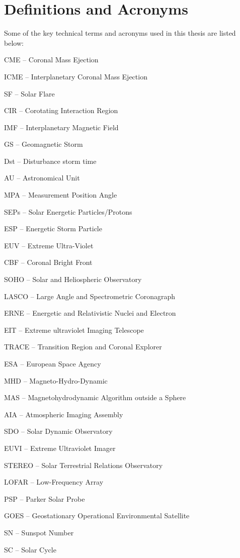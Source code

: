 \section{Definitions and Acronyms}
Some of the key technical terms and acronyms used in this thesis are listed below:

CME -- Coronal Mass Ejection

ICME -- Interplanetary Coronal Mass Ejection

SF -- Solar Flare

CIR -- Corotating Interaction Region

IMF -- Interplanetary Magnetic Field

GS -- Geomagnetic Storm

Dst -- Disturbance storm time

AU -- Astronomical Unit

MPA -- Measurement Position Angle

SEPs -- Solar Energetic Particles/Protons

ESP -- Energetic Storm Particle

EUV -- Extreme Ultra-Violet

CBF -- Coronal Bright Front

SOHO -- Solar and Heliospheric Observatory

LASCO -- Large Angle and Spectrometric Coronagraph

ERNE -- Energetic and Relativistic Nuclei and Electron

EIT -- Extreme ultraviolet Imaging Telescope

TRACE -- Transition Region and Coronal Explorer

ESA -- European Space Agency

MHD -- Magneto-Hydro-Dynamic

MAS -- Magnetohydrodynamic Algorithm outside a Sphere

AIA -- Atmospheric Imaging Assembly

SDO -- Solar Dynamic Observatory

EUVI -- Extreme Ultraviolet Imager

STEREO -- Solar Terrestrial Relations Observatory

LOFAR -- Low-Frequency Array

PSP -- Parker Solar Probe

GOES -- Geostationary Operational Environmental Satellite

SN -- Sunspot Number

SC -- Solar Cycle

